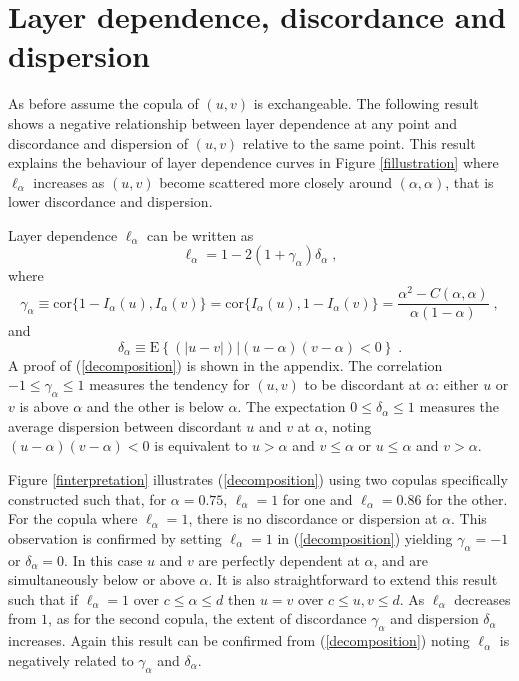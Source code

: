 \documentclass[authoryear]{elsarticle}
\newcommand{\E}{{\mathrm E}}
\newcommand{\cor}{\mathrm{cor}}
\newcommand{\eref}[1]{(\ref{#1})}
\newcommand{\fref}[1]{Figure \ref{#1}}
\begin{document}
\section{Layer dependence, discordance and dispersion}\label{sdecompose}

As before assume the copula of $(u,v)$ is exchangeable. The following result shows a negative relationship between layer dependence at any point and discordance and dispersion of $(u,v)$ relative to the same point. This result explains the behaviour of layer dependence curves in \fref{fillustration} where $\ell_\alpha$ increases as $(u,v)$ become scattered more closely around $(\alpha,\alpha)$, that is lower discordance and dispersion.

Layer dependence $\ell_\alpha$ can be written as
\begin{equation}\label{decomposition}
\ell_\alpha = 1-2(1+\gamma_\alpha) \delta_\alpha \;,
\end{equation}
where
$$
\gamma_\alpha \equiv \cor\{1-I_\alpha(u),I_\alpha(v)\} =\cor\{I_\alpha(u),1-I_\alpha(v)\}=\frac{\alpha^2-C(\alpha,\alpha)}{\alpha(1-\alpha)}\;,
$$
and
$$
\delta_\alpha \equiv\E\left\{(|u-v|)|(u-\alpha)(v-\alpha)<0\right\}  \; .
$$
A proof of \eref{decomposition} is shown in the appendix. The correlation $-1\leq\gamma_\alpha\leq 1$ measures the tendency for $(u,v)$ to be discordant at $\alpha$: either $u$ or $v$ is above $\alpha$ and the other is below $\alpha$. The expectation $0\leq \delta_\alpha\leq 1$ measures the average dispersion between discordant $u$ and $v$ at $\alpha$, noting $(u-\alpha)(v-\alpha)<0$ is equivalent to $u>\alpha$ and $v\le\alpha$ or $u\le\alpha$ and $v>\alpha$.


\fref{finterpretation} illustrates \eref{decomposition} using two copulas specifically constructed such that, for $\alpha=0.75$, $\ell_\alpha=1$ for one and $\ell_\alpha=0.86$ for the other. For the copula where $\ell_\alpha=1$, there is no discordance or dispersion at $\alpha$. This observation is confirmed by setting $\ell_\alpha=1$ in \eref{decomposition} yielding $\gamma_\alpha=-1$ or $\delta_\alpha=0$. In this case $u$ and $v$ are perfectly dependent at $\alpha$, and are simultaneously below or above $\alpha$. It is also straightforward to extend this result such that if $\ell_\alpha=1$ over $c\le\alpha\le d$ then $u=v$ over $c\le u,v\le d$. As $\ell_\alpha$ decreases from $1$, as for the second copula, the extent of discordance $\gamma_\alpha$ and dispersion $\delta_\alpha$ increases. Again this result can be confirmed from \eref{decomposition} noting $\ell_\alpha$ is negatively related to $\gamma_\alpha$ and $\delta_\alpha$.
\end{document}

